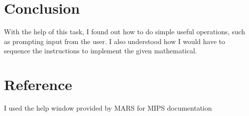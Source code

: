 \documentclass{article}
\begin{document}
    \section*{Conclusion}

    With the help of this task, I found out how to do simple useful operations, such as prompting input from the user. I also understood how I would have to sequence the instructions to implement the given mathematical.

    \section*{Reference}

    I used the help window provided by MARS for MIPS documentation
\end{document}
